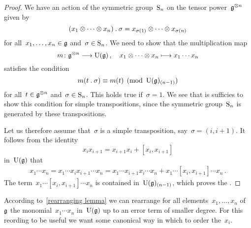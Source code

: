 \begin{proof}
	We have an action of the symmetric group~$\operatorname{S}_n$ on the tensor power~$\mathfrak{g}^{\otimes n}$ given by
	\[
		(x_1 \otimes \dotsb \otimes x_n) \mathbin{.} \sigma
		=
		x_{\sigma(1)} \otimes \dotsb \otimes x_{\sigma(n)}
	\]
	for all~$x_1, \dotsc, x_n \in \mathfrak{g}$ and~$\sigma \in \operatorname{S}_n$.
	We need to show that the multiplication map
	\[
		m
		\colon
		\glie^{\tensor n}
		\to
		\Univ(\glie) \,,
		\quad
		x_1 \tensor \dotsb \tensor x_n
		\mapsto
		x_1 \dotsm x_n
	\]
	satisfies the condition
	\[
		m(t \mathbin{.} \sigma)
		\equiv
		m(t)
		\pmod{\operatorname{U}(\mathfrak{g})_{(n-1)}}
	\]
	for all~$t \in \mathfrak{g}^{\otimes n}$ and~$\sigma \in \operatorname{S}_n$.
	This holds true if~$\sigma = 1$.
	We see that is sufficies to show this condition for simple transpositions, since the symmetric group~$\operatorname{S}_n$ is generated by these transpositions.

	Let us therefore assume that~$\sigma$ is a simple transposition, say~$\sigma = (i, i+1)$.
	It follows from the identity
	\[
		x_i x_{i+1}
		=
		x_{i+1} x_i + [x_i, x_{i+1}]
	\]
	in~$\operatorname{U}(\mathfrak{g})$ that
	\begin{align*}
		x_1 \dotsm x_n
		=
		x_1 \dotsm x_i x_{i+1} \dotsm x_n
		=
		x_1 \dotsm x_{i+1} x_i\dotsm x_n
		+
		x_1 \dotsm [x_i, x_{i+1}] \dotsm x_n \,.
	\end{align*}
	The term~$x_1 \dotsm [x_i, x_{i+1}] \dotsm x_n$ is contained in~$\operatorname{U}(\mathfrak{g})_{(n-1)}$, which proves the .
\end{proof}


\begin{fluff}
	According to~\cref{rearranging lemma} we can rearrange for all elements~$x_1, \dotsc, x_n$ of~$\mathfrak{g}$ the monomial~$x_1 \dotsm x_n$ in~$\operatorname{U}(\mathfrak{g})$ up to an error term of smaller degree.
	For this reording to be useful we want some canonical way in which to order the~$x_i$.
\end{fluff}



